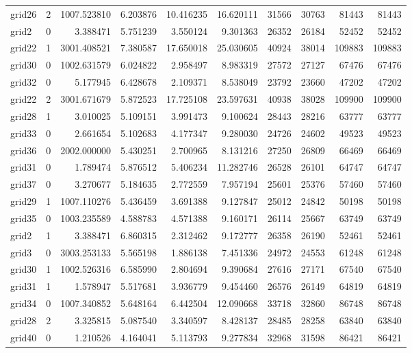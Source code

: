 \begin{longtable}{|l|r|r|r|r|r|r|r|r|r|}
grid26 & 2 & 1007.523810 & 6.203876 & 10.416235 & 16.620111 & 31566 & 30763 & 81443 & 81443 \\
grid2 & 0 & 3.388471 & 5.751239 & 3.550124 & 9.301363 & 26352 & 26184 & 52452 & 52452 \\
grid22 & 1 & 3001.408521 & 7.380587 & 17.650018 & 25.030605 & 40924 & 38014 & 109883 & 109883 \\
grid30 & 0 & 1002.631579 & 6.024822 & 2.958497 & 8.983319 & 27572 & 27127 & 67476 & 67476 \\
grid32 & 0 & 5.177945 & 6.428678 & 2.109371 & 8.538049 & 23792 & 23660 & 47202 & 47202 \\
grid22 & 2 & 3001.671679 & 5.872523 & 17.725108 & 23.597631 & 40938 & 38028 & 109900 & 109900 \\
grid28 & 1 & 3.010025 & 5.109151 & 3.991473 & 9.100624 & 28443 & 28216 & 63777 & 63777 \\
grid33 & 0 & 2.661654 & 5.102683 & 4.177347 & 9.280030 & 24726 & 24602 & 49523 & 49523 \\
grid36 & 0 & 2002.000000 & 5.430251 & 2.700965 & 8.131216 & 27250 & 26809 & 66469 & 66469 \\
grid31 & 0 & 1.789474 & 5.876512 & 5.406234 & 11.282746 & 26528 & 26101 & 64747 & 64747 \\
grid37 & 0 & 3.270677 & 5.184635 & 2.772559 & 7.957194 & 25601 & 25376 & 57460 & 57460 \\
grid29 & 1 & 1007.110276 & 5.436459 & 3.691388 & 9.127847 & 25012 & 24842 & 50198 & 50198 \\
grid35 & 0 & 1003.235589 & 4.588783 & 4.571388 & 9.160171 & 26114 & 25667 & 63749 & 63749 \\
grid2 & 1 & 3.388471 & 6.860315 & 2.312462 & 9.172777 & 26358 & 26190 & 52461 & 52461 \\
grid3 & 0 & 3003.253133 & 5.565198 & 1.886138 & 7.451336 & 24972 & 24553 & 61248 & 61248 \\
grid30 & 1 & 1002.526316 & 6.585990 & 2.804694 & 9.390684 & 27616 & 27171 & 67540 & 67540 \\
grid31 & 1 & 1.578947 & 5.517681 & 3.936779 & 9.454460 & 26576 & 26149 & 64819 & 64819 \\
grid34 & 0 & 1007.340852 & 5.648164 & 6.442504 & 12.090668 & 33718 & 32860 & 86748 & 86748 \\
grid28 & 2 & 3.325815 & 5.087540 & 3.340597 & 8.428137 & 28485 & 28258 & 63840 & 63840 \\
grid40 & 0 & 1.210526 & 4.164041 & 5.113793 & 9.277834 & 32968 & 31598 & 86421 & 86421 \\

\end{longtable}
